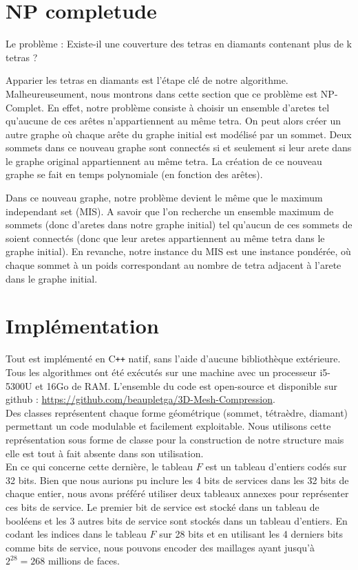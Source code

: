 \documentclass[a4paper,11pt,openany]{article}
\begin{document}
\section{NP completude}
Le problème : Existe-il une couverture des tetras en diamants contenant plus de k tetras ?

Apparier les tetras en diamants est l'étape clé de notre algorithme. Malheureuseument, nous montrons dans cette section que ce problème est NP-Complet.
En effet, notre problème consiste à choisir un ensemble d'aretes tel qu'aucune de ces arêtes n'appartiennent au même tetra.
On peut alors créer un autre graphe où chaque arête du graphe initial est modélisé par un sommet. Deux sommets dans ce nouveau graphe sont connectés si et seulement si leur arete dans le graphe original appartiennent au même tetra.
La création de ce nouveau graphe se fait en temps polynomiale (en fonction des arêtes).

Dans ce nouveau graphe, notre problème devient le même que le maximum independant set (MIS). A savoir que l'on recherche un ensemble maximum de sommets (donc d'aretes dans notre graphe initial) tel qu'aucun de ces sommets de soient connectés (donc que leur aretes appartiennent au même tetra dans le graphe initial).
En revanche, notre instance du MIS est une instance pondérée, où chaque sommet à un poids correspondant au nombre de tetra adjacent à l'arete dans le graphe initial.

\section{Implémentation}
\noindent
Tout est implémenté en C\texttt{++} natif, sans l'aide d'aucune bibliothèque extérieure. Tous les algorithmes ont été exécutés sur une machine avec un processeur i5-5300U et 16Go de RAM. L'ensemble du code est open-source et disponible sur github : \url{https://github.com/beaupletga/3D-Mesh-Compression}.\\
Des classes représentent chaque forme géométrique (sommet, tétraèdre, diamant) permettant un code modulable et facilement exploitable. Nous utilisons cette représentation sous forme de classe pour la construction de notre structure mais elle est tout à fait absente dans son utilisation. \\
En ce qui concerne cette dernière, le tableau $F$ est un tableau d'entiers codés sur 32 bits. Bien que nous aurions pu inclure les 4 bits de services dans les 32 bits de chaque entier, nous avons préféré utiliser deux tableaux annexes pour représenter ces bits de service. Le premier bit de service est stocké dans un tableau de booléens et les 3 autres bits de service sont stockés dans un tableau d'entiers. En codant les indices dans le tableau $F$ sur 28 bits et en utilisant les 4 derniers bits comme bits de service, nous pouvons encoder des maillages ayant jusqu'à $2^{28}=268$ millions de faces.
\end{document}
